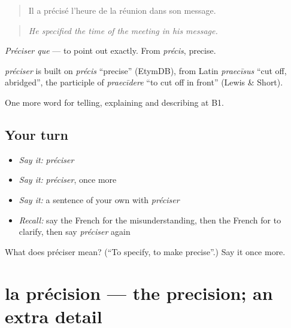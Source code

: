 \begin{quote}
Il a précisé l'heure de la réunion dans son message.
\end{quote}

\begin{quote}
\emph{He specified the time of the meeting in his message.}
\end{quote}

\emph{Préciser que} — to point out exactly. From \emph{précis}, precise.

\begin{cousinweb}
\emph{préciser} is built on \emph{précis} \textquotedblleft{}precise\textquotedblright{} (EtymDB), from Latin \emph{praecīsus} \textquotedblleft{}cut off, abridged\textquotedblright{}, the participle of \emph{praecīdere} \textquotedblleft{}to cut off in front\textquotedblright{} (Lewis \& Short).
\end{cousinweb}

\begin{grammarlens}[title={What you've built}]
One more word for telling, explaining and describing at B1.
\end{grammarlens}

\subsection*{Your turn}
\begin{itemize}
\raggedright
  \item \emph{Say it:} \emph{préciser}
  \item \emph{Say it:} \emph{préciser}, once more
  \item \emph{Say it:} a sentence of your own with \emph{préciser}
  \item \emph{Recall:} say the French for the misunderstanding, then the French for to clarify, then say \emph{préciser} again
\end{itemize}

\begin{tcolorbox}[breakable,colback=teal!4,colframe=teal!35!black,title={Before you move on}]
What does préciser mean? (\textquotedblleft{}To specify, to make precise\textquotedblright{}.) Say it once more.
\end{tcolorbox}
\section[la précision]{la précision — the precision; an extra detail}

\label{lesson:FR-C341-precision}



